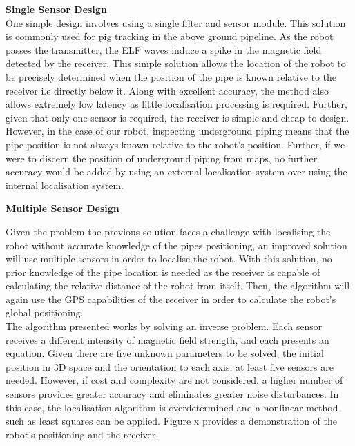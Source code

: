 \documentclass[11pt]{article}		%
\begin{document}
		\textbf{Single Sensor Design}\\
		One simple design involves using a single filter and sensor module. This solution is commonly used for pig tracking in the above ground pipeline. As the robot passes the transmitter, the ELF waves induce a spike in the magnetic field detected by the receiver. This simple solution allows the location of the robot to be precisely determined when the position of the pipe is known relative to the receiver i.e directly below it. Along with excellent accuracy, the method also allows extremely low latency as little localisation processing is required. Further, given that only one sensor is required, the receiver is simple and cheap to design. \\
    	\hspace*{3ex}However, in the case of our robot, inspecting underground piping means that the pipe position is not always known relative to the robot's position. Further, if we were to discern the position of underground piping from maps, no further accuracy would be added by using an external localisation system over using the internal localisation system. 

        \textbf{Multiple Sensor Design}
		
		Given the problem the previous solution faces a challenge with localising the robot without accurate knowledge of the pipes positioning, an improved solution will use multiple sensors in order to localise the robot. With this solution, no prior knowledge of the pipe location is needed as the receiver is capable of calculating the relative distance of the robot from itself. Then, the algorithm will again use the GPS capabilities of the receiver in order to calculate the robot's global positioning. \\
		
		\hspace*{3ex}The algorithm presented works by solving an inverse problem. Each sensor receives a different intensity of magnetic field strength, and each presents an equation. Given there are five unknown parameters to be solved, the initial position in 3D space and the orientation to each axis, at least five sensors are needed. However, if cost and complexity are not considered, a higher number of sensors provides greater accuracy and eliminates greater noise disturbances. In this case, the localisation algorithm is overdetermined and a nonlinear method such as least squares can be applied. Figure x provides a demonstration of the robot's positioning and the receiver.\\
		
\end{document}
